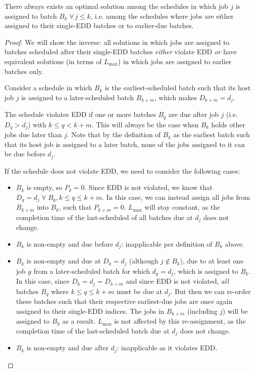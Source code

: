 \documentclass[oribibl]{llncs}
\def\Lmax{{L_{\mathrm{max}}}}
\begin{document}
\begin{proposition} \label{prop:movebackonly}
There always exists an optimal solution among the schedules in which job $j$ is assigned to batch
$B_k \; \forall \,j \leq k$, i.e. among the schedules where jobs are either assigned to
their single-EDD batches or to earlier-due batches.
\end{proposition}
\begin{proof}
  We will show the inverse: all solutions in which jobs are assigned to batches
  scheduled after their single-EDD batches \textit{either} violate EDD
  \textit{or} have equivalent solutions (in terms of $\Lmax$)
  in which jobs are assigned to earlier batches only.

  Consider a schedule in which $B_k$ is the earliest-scheduled batch such that
  its host job $j$ is assigned to a later-scheduled batch $B_{k+m}$, which makes
  $D_{k+m} = d_j$.

  The schedule violates EDD if one or more batches $B_q$ are due after
  job $j$ (i.e. $D_q>d_j$) with $k\leq q<k+m$. This will always be the
  case when $B_k$ holds other jobs due later than $j$. Note that by the
  definition of $B_k$ as the earliest batch such that its host job is
  assigned to a later batch, none of the jobs assigned to it can be due
  before $d_j$.

  If the schedule does not violate EDD, we need to consider the following cases:
  \begin{itemize}
    \item{$B_k$ is empty, so $P_k = 0$. Since EDD is not violated, we
    know that $D_q = d_j\;\forall\;B_q, k \leq q \leq k+m$. In this case,
    we can instead assign all jobs from $B_{k+m}$ into $B_k$, such that
    $P_{k+m} = 0$. $\Lmax$ will stay constant, as the completion time of
    the last-scheduled of all batches due at $d_j$ does not change.}
    \item{$B_k$ is non-empty and due before $d_j$: inapplicable per definition
        of $B_k$ above.}
    \item{$B_k$ is non-empty and due at $D_k = d_j$ (although $j \notin B_k$), due
        to at least one job $g$ from a later-scheduled batch for which
        $d_g = d_j$, which is assigned to $B_k$. In this case, since $D_k
        = d_j = D_{k+m}$ and since EDD is not violated, \textit{all} batches $B_q$
        where $k \leq q \leq k+m$ must be due at $d_j$. But then we can re-order
        these batches such that their respective earliest-due jobs are once
        again assigned to their single-EDD indices. The jobs in $B_{k+m}$
        (including $j$) will be assigned to $B_k$ as a result. $\Lmax$
    is not affected by this re-assignment, as the completion time of the
    last-scheduled batch due
  at $d_j$ does not change.}
    \item{$B_k$ is non-empty and due after $d_j$: inapplicable as it violates
      EDD.}
  \end{itemize}
\end{proof}
\end{document}
